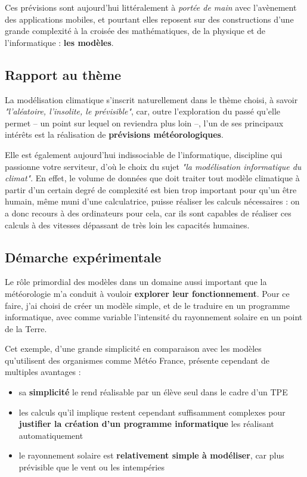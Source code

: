 \documentclass[12pt]{article}
\begin{document}
Ces prévisions sont aujourd'hui littéralement à \textit{portée de main} avec l'avènement des applications mobiles, et pourtant elles reposent sur des constructions d'une grande complexité à la croisée des mathématiques, de la physique et de l'informatique : \textbf{les modèles}.

\subsection{Rapport au thème}

La modélisation climatique s'inscrit naturellement dans le thème choisi, à savoir \textit{"l'aléatoire, l'insolite, le prévisible"}, car, outre l'exploration du passé qu'elle permet -- un point sur lequel on reviendra plus loin --, l'un de ses principaux intérêts est la réalisation de \textbf{prévisions météorologiques}.

Elle est également aujourd'hui indissociable de l'informatique, discipline qui passionne votre serviteur, d'où le choix du sujet \textit{"la modélisation informatique du climat"}.
En effet, le volume de données que doit traiter tout modèle climatique à partir d'un certain degré de complexité est bien trop important pour qu'un être humain, même muni d'une calculatrice, puisse réaliser les calculs nécessaires : on a donc recours à des ordinateurs pour cela, car ils sont capables de réaliser ces calculs à des vitesses dépassant de très loin les capacités humaines.

\subsection{Démarche expérimentale}

Le rôle primordial des modèles dans un domaine aussi important que la météorologie m'a conduit à vouloir \textbf{explorer leur fonctionnement}.
Pour ce faire, j'ai choisi de créer un modèle simple, et de le traduire en un programme informatique, avec comme variable l'intensité du rayonnement solaire en un point de la Terre.

Cet exemple, d'une grande simplicité en comparaison avec les modèles qu'utilisent des organismes comme Météo France, présente cependant de multiples avantages :

\begin{itemize}
  \item sa \textbf{simplicité} le rend réalisable par un élève seul dans le cadre d'un TPE
  \item les calculs qu'il implique restent cependant suffisamment complexes pour \textbf{justifier la création d'un programme informatique} les réalisant automatiquement
  \item le rayonnement solaire est \textbf{relativement simple à modéliser}, car plus prévisible que le vent ou les intempéries
\end{itemize}
\end{document}
